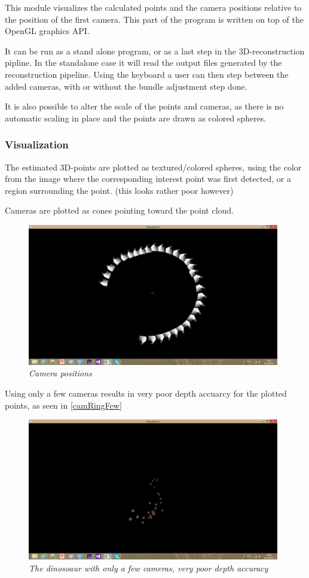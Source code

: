 This module visualizes the calculated points and the camera positions relative to the position of the first camera. This part of the program is written on top of the OpenGL graphics API.

It can be run as a stand alone program, or as a last step in the 3D-reconstruction pipline. In the standalone case it will read the output files generated by the reconstruction pipeline. Using the keyboard a user can then step between the added cameras, with or without the bundle adjustment step done.

It is also possible to alter the scale of the points and cameras, as there is no automatic scaling in place and the points are drawn as colored spheres.

\subsubsection{Visualization}
The estimated 3D-points are plotted as textured/colored spheres, using the color from the image where the corresponding interest point was first detected, or a region surrounding the point. (this looks rather poor however)

Cameras are plotted as cones pointing toward the point cloud.

\begin{figure}[htb]
	\centering
	\includegraphics[width=110mm]{images/camRingLots.png}
	\caption{\textit{Camera positions}}
	\label{fig:camRingLots}  %
\end{figure}

Using only a few cameras results in very poor depth accuarcy for the plotted points, as seen in 
\ref{camRingFew}

\begin{figure}[htb]
	\centering
	\includegraphics[width=110mm]{images/pointCloudFewCam.png}
	\caption{\textit{The dinosoaur with only a few cameras, very poor depth accuracy}}
	\label{fig:camRingFew}  %
\end{figure}

